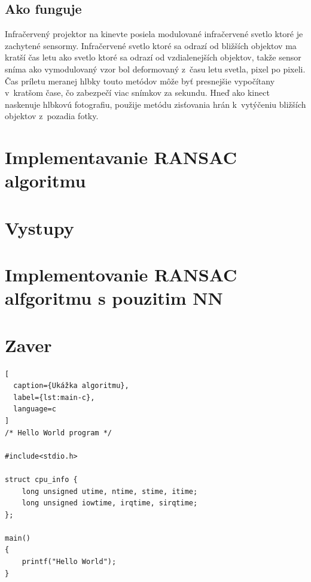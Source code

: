 \subsection{Ako funguje}
Infračervený projektor na kinevte posiela modulované infračervené svetlo ktoré je zachytené sensormy. Infračervené svetlo ktoré sa odrazí od bližších objektov ma kratší čas letu ako svetlo ktoré sa odrazí od vzdialenejších objektov, takže sensor sníma ako vymodulovaný vzor bol deformovaný z času letu svetla, pixel po pixeli. Čas príletu meranej hlbky touto metódov môže byť presnejšie vypočítany v kratšom čase, čo zabezpečí viac snímkov za sekundu. Hneď ako kinect naskenuje hlbkovú fotografiu, použije metódu zisťovania hrán k vytýčeniu bližších objektov z pozadia fotky. 
\section{Implementavanie RANSAC algoritmu}
\section{Vystupy}
\section{Implementovanie RANSAC alfgoritmu s pouzitim NN}
\section{Zaver}

\begin{lstlisting}[
  caption={Ukážka algoritmu},
  label={lst:main-c},
  language=c
]
/* Hello World program */

#include<stdio.h>

struct cpu_info {
    long unsigned utime, ntime, stime, itime;
    long unsigned iowtime, irqtime, sirqtime;
};

main()
{
    printf("Hello World");
}
\end{lstlisting}